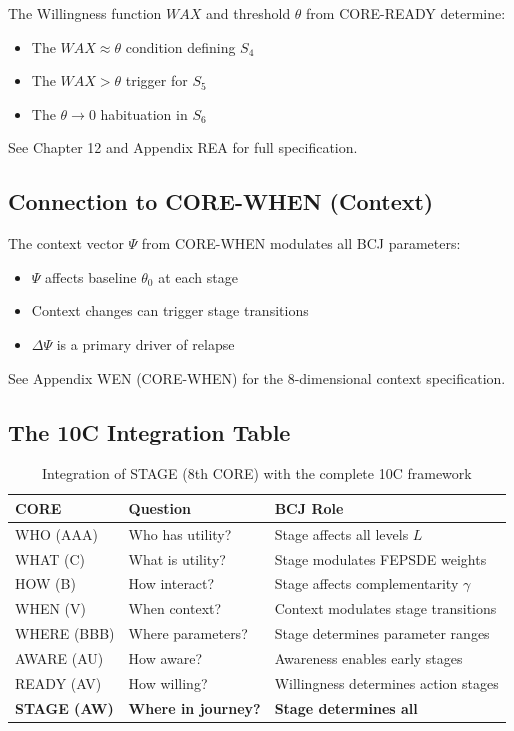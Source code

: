 \begin{cross-reference}
The Willingness function $WAX$ and threshold $\theta$ from CORE-READY determine:
\begin{itemize}
    \item The $WAX \approx \theta$ condition defining $S_4$
    \item The $WAX > \theta$ trigger for $S_5$
    \item The $\theta \to 0$ habituation in $S_6$
\end{itemize}
See Chapter 12 and Appendix REA for full specification.
\end{cross-reference}

\subsection{Connection to CORE-WHEN (Context)}
\label{sec:bcj-context}

\begin{cross-reference}
The context vector $\Psi$ from CORE-WHEN modulates all BCJ parameters:
\begin{itemize}
    \item $\Psi$ affects baseline $\theta_0$ at each stage
    \item Context changes can trigger stage transitions
    \item $\Delta\Psi$ is a primary driver of relapse
\end{itemize}
See Appendix WEN (CORE-WHEN) for the 8-dimensional context specification.
\end{cross-reference}

\subsection{The 10C Integration Table}

\begin{table}[h]
\centering
\begin{tabular}{lll}
\toprule
\textbf{CORE} & \textbf{Question} & \textbf{BCJ Role} \\
\midrule
WHO (AAA) & Who has utility? & Stage affects all levels $L$ \\
WHAT (C) & What is utility? & Stage modulates FEPSDE weights \\
HOW (B) & How interact? & Stage affects complementarity $\gamma$ \\
WHEN (V) & When context? & Context modulates stage transitions \\
WHERE (BBB) & Where parameters? & Stage determines parameter ranges \\
AWARE (AU) & How aware? & Awareness enables early stages \\
READY (AV) & How willing? & Willingness determines action stages \\
\textbf{STAGE (AW)} & \textbf{Where in journey?} & \textbf{Stage determines all} \\
\bottomrule
\end{tabular}
\caption{Integration of STAGE (8th CORE) with the complete 10C framework}
\label{tab:10c-integration}
\end{table}


